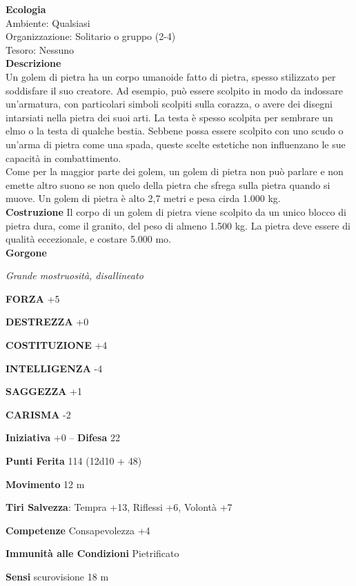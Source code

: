 \begin{multicols}{2}
\textbf{Ecologia}\\
Ambiente: Qualsiasi\\
Organizzazione: Solitario o gruppo (2-4)\\
Tesoro: Nessuno\\
\textbf{Descrizione}\\
Un golem di pietra ha un corpo umanoide fatto di pietra, spesso stilizzato per soddisfare il suo creatore. Ad esempio, può essere scolpito in modo da indossare un'armatura, con particolari simboli scolpiti sulla corazza, o avere dei disegni intarsiati nella pietra dei suoi arti. La testa è spesso scolpita per sembrare un elmo o la testa di qualche bestia. Sebbene possa essere scolpito con uno scudo o un'arma di pietra come una spada, queste scelte estetiche non influenzano le sue capacità in combattimento.\\

Come per la maggior parte dei golem, un golem di pietra non può parlare e non emette altro suono se non quelo della pietra che sfrega sulla pietra quando si muove. Un golem di pietra è alto 2,7 metri e pesa cirda 1.000 kg.\\

\textbf{Costruzione}
Il corpo di un golem di pietra viene scolpito da un unico blocco di pietra dura, come il granito, del peso di almeno 1.500 kg. La pietra deve essere di qualità eccezionale, e costare 5.000 mo.\\


\medskip{}\textbf{Gorgone}

\emph{Grande mostruosità, disallineato}

\textbf{FORZA} +5

\textbf{DESTREZZA} +0

\textbf{COSTITUZIONE} +4

\textbf{INTELLIGENZA} -4

\textbf{SAGGEZZA} +1

\textbf{CARISMA} -2

\textbf{Iniziativa} +0 -- \textbf{Difesa} 22

\textbf{Punti Ferita} 114 (12d10 + 48)

\textbf{Movimento} 12 m

\textbf{Tiri Salvezza}: Tempra +13, Riflessi +6, Volontà +7

\textbf{Competenze} Consapevolezza +4

\textbf{Immunità alle Condizioni} Pietrificato

\textbf{Sensi} scurovisione 18 m


\end{multicols}
